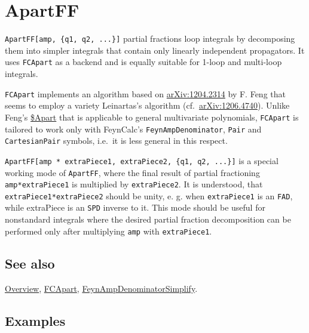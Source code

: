 \documentclass[../FeynCalcManual.tex]{subfiles}
\begin{document}
\hypertarget{apartff}{%
\section{ApartFF}\label{apartff}}

\texttt{ApartFF[\allowbreak{}amp,\ \allowbreak{}\{\allowbreak{}q1,\ \allowbreak{}q2,\ \allowbreak{}...\}]}
partial fractions loop integrals by decomposing them into simpler
integrals that contain only linearly independent propagators. It uses
\texttt{FCApart} as a backend and is equally suitable for 1-loop and
multi-loop integrals.

\texttt{FCApart} implements an algorithm based on
\href{https://arxiv.org/abs/1204.2314}{arXiv:1204.2314} by F. Feng that
seems to employ a variety Leinartas's algorithm
(cf.~\href{https://arxiv.org/abs/1206.4740}{arXiv:1206.4740}). Unlike
Feng's \href{https://github.com/F-Feng/APart}{\$Apart} that is
applicable to general multivariate polynomials, \texttt{FCApart} is
tailored to work only with FeynCalc's \texttt{FeynAmpDenominator},
\texttt{Pair} and \texttt{CartesianPair} symbols, i.e.~it is less
general in this respect.

\texttt{ApartFF[\allowbreak{}amp * extraPiece1,\ \allowbreak{}extraPiece2,\ \allowbreak{}\{\allowbreak{}q1,\ \allowbreak{}q2,\ \allowbreak{}...\}]}
is a special working mode of \texttt{ApartFF}, where the final result of
partial fractioning \texttt{amp*extraPiece1} is multiplied by
\texttt{extraPiece2}. It is understood, that
\texttt{extraPiece1*extraPiece2} should be unity, e. g. when
\texttt{extraPiece1} is an \texttt{FAD}, while extraPiece is an
\texttt{SPD} inverse to it. This mode should be useful for nonstandard
integrals where the desired partial fraction decomposition can be
performed only after multiplying \texttt{amp} with \texttt{extraPiece1}.

\subsection{See also}

\hyperlink{toc}{Overview}, \hyperlink{fcapart}{FCApart},
\hyperlink{feynampdenominatorsimplify}{FeynAmpDenominatorSimplify}.

\subsection{Examples}

\begin{Shaded}
\begin{Highlighting}[]
\OperatorTok{[]}
\end{Highlighting}
\end{Shaded}
\end{document}
